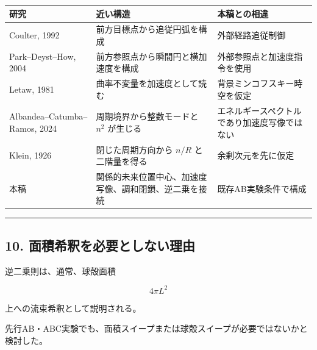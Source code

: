 \documentclass[
  a4paper,
]{ltjsarticle}
\newcounter{none} %
\begin{document}
{\def\LTcaptype{none} %
\begin{longtable}[]{@{}
  >{\raggedright\arraybackslash}p{}
  >{\raggedright\arraybackslash}p{}
  >{\raggedright\arraybackslash}p{}@{}}
\toprule\noalign{}
\begin{minipage}[b]{\linewidth}\raggedright
研究
\end{minipage} & \begin{minipage}[b]{\linewidth}\raggedright
近い構造
\end{minipage} & \begin{minipage}[b]{\linewidth}\raggedright
本稿との相違
\end{minipage} \\
\midrule\noalign{}
\endhead
\bottomrule\noalign{}
\endlastfoot
Coulter, 1992 & 前方目標点から追従円弧を構成 & 外部経路追従制御 \\
Park--Deyst--How, 2004 & 前方参照点から瞬間円と横加速度を構成 &
外部参照点と加速度指令を使用 \\
Letaw, 1981 & 曲率不変量を加速度として読む &
背景ミンコフスキー時空を仮定 \\
Albandea--Catumba--Ramos, 2024 & 周期境界から整数モードと \(n^2\)
が生じる & エネルギースペクトルであり加速度写像ではない \\
Klein, 1926 & 閉じた周期方向から \(n/R\) と二階量を得る &
余剰次元を先に仮定 \\
本稿 & 関係的未来位置中心、加速度写像、調和閉鎖、逆二乗を接続 &
既存AB実験条件で構成 \\
\end{longtable}
}

\begin{center}\rule{0.5\linewidth}{0.5pt}\end{center}

\subsection{10.
面積希釈を必要としない理由}\label{ux9762ux7a4dux5e0cux91c8ux3092ux5fc5ux8981ux3068ux3057ux306aux3044ux7406ux7531}

逆二乗則は、通常、球殻面積

\[
4\pi L^2
\]

上への流束希釈として説明される。

先行AB・ABC実験でも、面積スイープまたは球殻スイープが必要ではないかと検討した。
\end{document}
